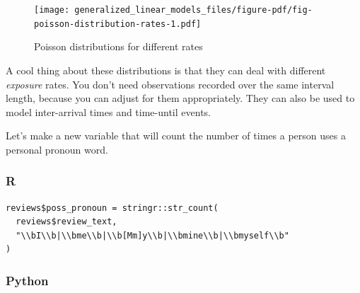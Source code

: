 \documentclass[
  letterpaper,
]{krantz}
\begin{document}
\begin{figure}

{\centering \texttt{[image: generalized\_linear\_models\_files/figure-pdf/fig-poisson-distribution-rates-1.pdf]}

}

\caption{\label{fig-poisson-distribution-rates}Poisson distributions for
different rates}

\end{figure}

\begin{tcolorbox}[enhanced jigsaw, toprule=.15mm, colback=white, breakable, rightrule=.15mm, arc=.35mm, bottomrule=.15mm, opacityback=0, colframe=quarto-callout-note-color-frame, leftrule=.75mm, left=2mm]
\begin{minipage}[t]{5.5mm}
\textcolor{quarto-callout-note-color}{\faInfo}
\end{minipage}%
\begin{minipage}[t]{\textwidth - 5.5mm}

A cool thing about these distributions is that they can deal with
different \emph{exposure} rates. You don't need observations recorded
over the same interval length, because you can adjust for them
appropriately. They can also be used to model inter-arrival times and
time-until events.

\end{minipage}%
\end{tcolorbox}

Let's make a new variable that will count the number of times a person
uses a personal pronoun word.

\subsubsection{R}

\begin{verbatim}
reviews$poss_pronoun = stringr::str_count(
  reviews$review_text, 
  "\\bI\\b|\\bme\\b|\\b[Mm]y\\b|\\bmine\\b|\\bmyself\\b"
)
\end{verbatim}

\subsubsection{Python}
\end{document}
